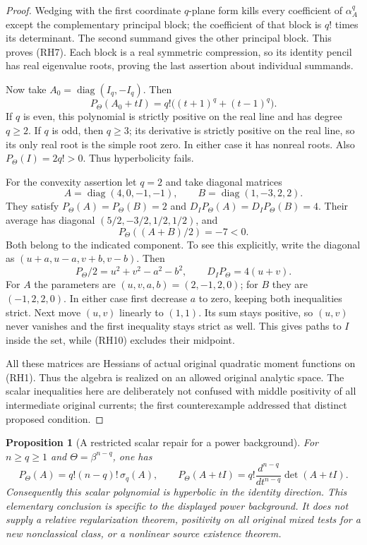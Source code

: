 \documentclass[11pt,a4paper]{article}
\numberwithin{equation}{section}
\newtheorem{proposition}[theorem]{Proposition}
\theoremstyle{definition}
\theoremstyle{remark}
\begin{document}
\begin{proof}
Wedging with the first coordinate $q$-plane form kills
every coefficient of $\alpha_A^q$ except the complementary
principal block; the coefficient of that block is $q!$
times its determinant.  The second summand gives the
other principal block.  This proves \textup{(RH7)}.
Each block is a real symmetric compression, so its
identity pencil has real eigenvalue roots, proving the
last assertion about individual summands.

Now take $A_0=\operatorname{diag}(I_q,-I_q)$.  Then
\[
 P_\Theta(A_0+tI)=q!\bigl((t+1)^q+(t-1)^q\bigr).
 \tag{RH8}
\]
If $q$ is even, this polynomial is strictly positive
on the real line and has degree $q\ge2$.  If $q$ is
odd, then $q\ge3$; its derivative is strictly positive
on the real line, so its only real root is the simple
root zero.  In either case it has nonreal roots.
Also $P_\Theta(I)=2q!>0$.  Thus hyperbolicity fails.

For the convexity assertion let $q=2$ and take diagonal
matrices
\[
 A=\operatorname{diag}(4,0,-1,-1),\qquad
 B=\operatorname{diag}(1,-3,2,2).
 \tag{RH9}
\]
They satisfy $P_\Theta(A)=P_\Theta(B)=2$ and
$D_I P_\Theta(A)=D_I P_\Theta(B)=4$.  Their average
has diagonal $(5/2,-3/2,1/2,1/2)$, and
\[
                       P_\Theta((A+B)/2)=-7<0.
 \tag{RH10}
\]
Both belong to the indicated component.  To see this
explicitly, write the diagonal as
$(u+a,u-a,v+b,v-b)$.  Then
\[
 P_\Theta/2=u^2+v^2-a^2-b^2,
                 \qquad D_I P_\Theta=4(u+v).
\]
For $A$ the parameters are $(u,v,a,b)=(2,-1,2,0)$;
for $B$ they are $(-1,2,2,0)$.  In either case first
decrease $a$ to zero, keeping both inequalities strict.
Next move $(u,v)$ linearly to $(1,1)$.  Its sum stays
positive, so $(u,v)$ never vanishes and the first
inequality stays strict as well.  This gives paths to
$I$ inside the set, while \textup{(RH10)} excludes
their midpoint.

All these matrices are Hessians of actual original
quadratic moment functions on \textup{(RH1)}.  Thus
the algebra is realized on an allowed original analytic
space.  The scalar inequalities here are deliberately
not confused with middle positivity of all intermediate
original currents; the first counterexample addressed
that distinct proposed condition.
\end{proof}

\begin{proposition}[A restricted scalar repair for a power background]
\label{prop:r12-power-background-hyperbolicity}
For $n\ge q\ge1$ and $\Theta=\beta^{n-q}$, one has
\[
 P_\Theta(A)=q!(n-q)!\,\sigma_q(A),
 \qquad
 P_\Theta(A+tI)=q!\frac{d^{n-q}}{dt^{n-q}}\det(A+tI).
 \tag{RH11}
\]
Consequently this scalar polynomial is hyperbolic in the
identity direction.  This elementary conclusion is
specific to the displayed power background.  It does
not supply a relative regularization theorem, positivity
on all original mixed tests for a new nonclassical class,
or a nonlinear source existence theorem.
\end{proposition}
\end{document}
